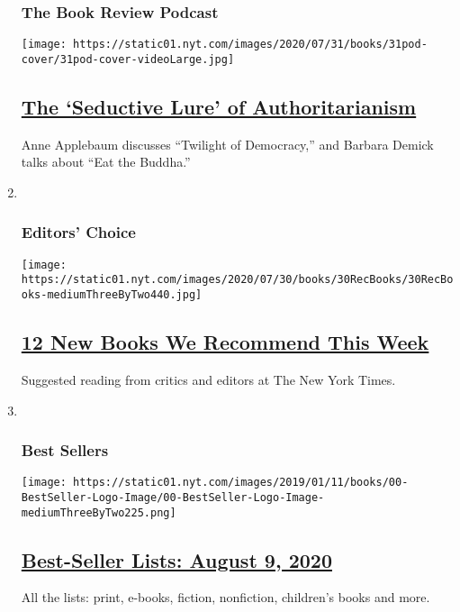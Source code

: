 \begin{enumerate}
{  \subsubsection{The Book Review
  Podcast}\label{the-book-review-podcast}}

  \texttt{[image: https://static01.nyt.com/images/2020/07/31/books/31pod-cover/31pod-cover-videoLarge.jpg]}

  \hypertarget{the-seductive-lure-of-authoritarianism}{%
  \subsection{\texorpdfstring{\href{/2020/07/31/books/review/podcast-twilight-democracy-anne-applebaum-eat-buddha-barbara-demick.html}{The
  `Seductive Lure' of
  Authoritarianism}}{The `Seductive Lure' of Authoritarianism}}\label{the-seductive-lure-of-authoritarianism}}

  Anne Applebaum discusses ``Twilight of Democracy,'' and Barbara Demick
  talks about ``Eat the Buddha.''
\item ~
  \hypertarget{editors-choice}{%
  \subsubsection{Editors' Choice}\label{editors-choice}}

  \texttt{[image: https://static01.nyt.com/images/2020/07/30/books/30RecBooks/30RecBooks-mediumThreeByTwo440.jpg]}

  \hypertarget{12-new-books-we-recommend-this-week}{%
  \subsection{\texorpdfstring{\href{/2020/07/30/books/review/12-new-books-we-recommend-this-week.html}{12
  New Books We Recommend This
  Week}}{12 New Books We Recommend This Week}}\label{12-new-books-we-recommend-this-week}}

  Suggested reading from critics and editors at The New York Times.
\item ~
  \hypertarget{best-sellers}{%
  \subsubsection{Best Sellers}\label{best-sellers}}

  \texttt{[image: https://static01.nyt.com/images/2019/01/11/books/00-BestSeller-Logo-Image/00-BestSeller-Logo-Image-mediumThreeByTwo225.png]}

  \hypertarget{best-seller-lists-august-9-2020}{%
  \subsection{\texorpdfstring{\href{/interactive/2020/01/29/books/review/best-sellers-promo-for-front-copy2.html}{Best-Seller
  Lists: August 9,
  2020}}{Best-Seller Lists: August 9, 2020}}\label{best-seller-lists-august-9-2020}}

  All the lists: print, e-books, fiction, nonfiction, children's books
  and more.
\end{enumerate}

